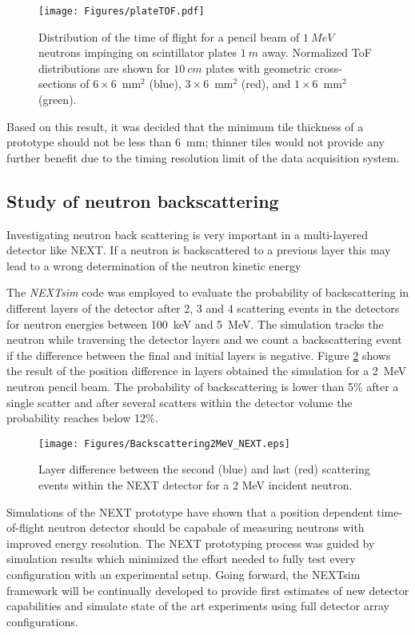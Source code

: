 \begin{figure}[tb]
\centering
\texttt{[image: Figures/plateTOF.pdf]}
\caption{Distribution of the time of flight for a pencil beam of $1~MeV$ neutrons impinging on scintillator plates $1~m$ away. Normalized ToF distributions are shown for $10~cm$ plates with geometric cross-sections of $6 \times 6$~mm$^{2}$ (blue), $3 \times 6$~mm$^{2}$ (red), and $1 \times 6$~mm$^{2}$ (green).}
\label{fig:plateTOF}
\end{figure}
Based on this result, it was decided that the minimum tile thickness of a prototype should not be less than 6~mm; thinner tiles would not provide any further benefit due to the timing resolution limit of the data acquisition system.

\subsection{Study of neutron backscattering}

Investigating neutron back scattering is very important in a multi-layered detector like NEXT. If a neutron is backscattered to a previous layer this may lead to a wrong determination  of the neutron kinetic energy 

The \emph{NEXTsim} code was employed to evaluate the probability of backscattering in different layers of the detector after 2, 3 and 4 scattering events in the detectors for neutron energies between 100~keV and 5~MeV. The simulation tracks the neutron while traversing the detector layers and we count a backscattering event if the difference between the final and initial layers is negative. Figure  \ref{fig:backscattering} shows the result of the position difference in layers obtained the simulation for a 2~MeV neutron pencil beam. The probability of backscattering is lower than 5\% after a single scatter and after several scatters within the detector volume the probability reaches below 12\%.

\begin{figure}[tb]
\centering
\texttt{[image: Figures/Backscattering2MeV\_NEXT.eps]}
\caption{Layer difference between the second (blue) and last (red) scattering events within the NEXT detector for a 2 MeV incident neutron.}
\label{fig:backscattering}
\end{figure}

Simulations of the NEXT prototype have shown that a position dependent time-of-flight neutron detector should be capabale of measuring neutrons with improved energy resolution. The NEXT prototyping process was guided by simulation results which minimized the effort needed to fully test every configuration with an experimental setup.
Going forward, the NEXTsim framework will be continually developed to provide first estimates of new detector capabilities and simulate state of the art experiments using full detector array configurations.

